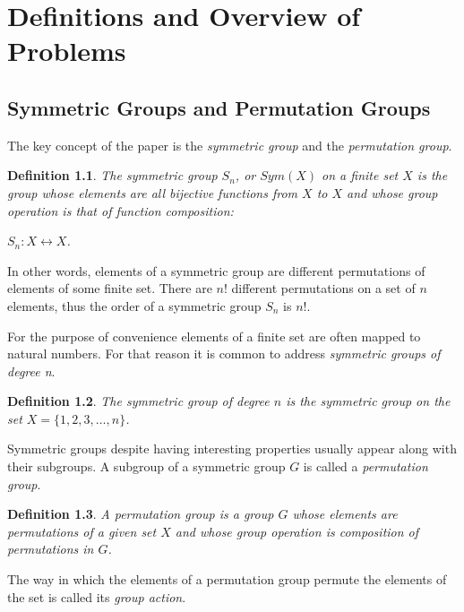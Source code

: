\documentclass[12pt]{report}
\newtheorem{definition}{Definition}[section]
\begin{document}
\newpage


\chapter{Definitions and Overview of Problems}

\section{Symmetric Groups and Permutation Groups}

\indent \par The key concept of the paper is the \textit{symmetric group} and the \textit{permutation group}.

\begin{definition}
	The symmetric group $S_n$, or $Sym(X)$ on a finite set $X$ is the group whose elements are all bijective functions from $X$ to $X$ and whose group operation is that of function composition:
	\begin{center}
		$S_n : X \leftrightarrow X$.
	\end{center}
\end{definition}

In other words, elements of a symmetric group are different permutations of elements of some finite set. There are $n!$ different permutations on a set of $n$ elements, thus the order of a symmetric group $S_n$ is $n!$.

For the purpose of convenience  elements of a finite set are often mapped to natural numbers. For that reason it is common to address \textit{symmetric groups of degree n}.

\begin{definition}
	The symmetric group of degree $n$ is the symmetric group on the set $X = \{1, 2, 3, \dots, n\}$.
\end{definition}

Symmetric groups despite having interesting properties usually appear along with their subgroups. A subgroup of a symmetric group $G$ is called a \textit{permutation group}.

\begin{definition}
	A permutation group is a group $G$ whose elements are permutations of a given set $X$ and whose group operation is composition of permutations in $G$.
\end{definition}

The way in which the elements of a permutation group permute the elements of the set is called its \textit{group action}.
\end{document}
